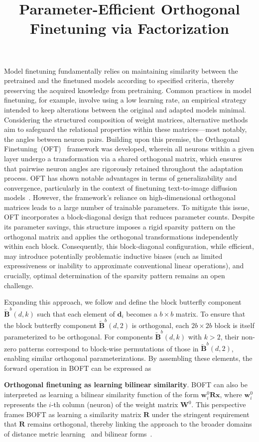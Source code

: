 \title{Parameter-Efficient Orthogonal Finetuning via Factorization}
Model finetuning fundamentally relies on maintaining similarity between the pretrained and the finetuned models according to specified criteria, thereby preserving the acquired knowledge from pretraining. Common practices in model finetuning, for example, involve using a low learning rate, an empirical strategy intended to keep alterations between the original and adapted models minimal. Considering the structured composition of weight matrices, alternative methods aim to safeguard the relational properties within these matrices—most notably, the angles between neuron pairs. Building upon this premise, the Orthogonal Finetuning~(OFT)~\cite{qiu2023controlling} framework was developed, wherein all neurons within a given layer undergo a transformation via a shared orthogonal matrix, which ensures that pairwise neuron angles are rigorously retained throughout the adaptation process. OFT has shown notable advantages in terms of generalizability and convergence, particularly in the context of finetuning text-to-image diffusion models~\cite{qiu2023controlling}. However, the framework’s reliance on high-dimensional orthogonal matrices leads to a large number of trainable parameters. To mitigate this issue, OFT incorporates a block-diagonal design that reduces parameter counts. Despite its parameter savings, this structure imposes a rigid sparsity pattern on the orthogonal matrix and applies the orthogonal transformations independently within each block. Consequently, this block-diagonal configuration, while efficient, may introduce potentially problematic inductive biases (such as limited expressiveness or inability to approximate conventional linear operations), and crucially, optimal determination of the sparsity pattern remains an open challenge.

Expanding this approach, we follow \cite{chen2022pixelated} and define the block butterfly component $\tilde{\bm{B}}^b(d,k)$ such that each element of $\bm{d}_i$ becomes a $b\times b$ matrix. To ensure that the block butterfly component $\tilde{\bm{B}}^b(d,2)$ is orthogonal, each $2b\times 2b$ block is itself parameterized to be orthogonal. For components $\tilde{\bm{B}}^b(d,k)$ with $k>2$, their non-zero patterns correspond to block-wise permutations of those in $\tilde{\bm{B}}^b(d,2)$, enabling similar orthogonal parameterizations. By assembling these elements, the forward operation in BOFT can be expressed as

\textbf{Orthogonal finetuning as learning bilinear similarity}. BOFT can also be interpreted as learning a bilinear similarity function of the form $\bm{w}^0_i\bm{R}\bm{x}$, where $\bm{w}^0_i$ represents the $i$-th column (neuron) of the weight matrix $\bm{W}^0$. This perspective frames BOFT as learning a similarity matrix $\bm{R}$ under the stringent requirement that $\bm{R}$ remains orthogonal, thereby linking the approach to the broader domains of distance metric learning~\cite{xing2002distance} and bilinear forms~\cite{roman2005advanced}.

